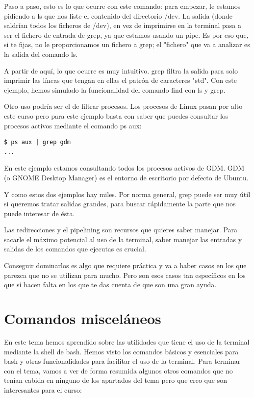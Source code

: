 Paso a paso, esto es lo que ocurre con este comando: para empezar, le estamos pidiendo a ls que nos liste el contenido del directorio /dev. La salida (donde saldrían todos los ficheros de /dev), en vez de imprimirse en la terminal pasa a ser el fichero de entrada de grep, ya que estamos usando un pipe. Es por eso que, si te fijas, no le proporcionamos un fichero a grep; el "fichero" que va a analizar es la salida del comando ls.

A partir de aquí, lo que ocurre es muy intuitivo. grep filtra la salida para solo imprimir las líneas que tengan en ellas el patrón de caracteres "std". Con este ejemplo, hemos simulado la funcionalidad del comando find con ls y grep.

Otro uso podría ser el de filtrar procesos. Los procesos de Linux pasan por alto este curso pero para este ejemplo basta con saber que puedes consultar los procesos activos mediante el comando ps aux:

\begin{tcolorbox-code}
\begin{lstlisting}
$ ps aux | grep gdm
...
\end{lstlisting}
\end{tcolorbox-code}

En este ejemplo estamos consultando todos los procesos activos de GDM. GDM (o GNOME Desktop Manager) es el entorno de escritorio por defecto de Ubuntu.

Y como estos dos ejemplos hay miles. Por norma general, grep puede ser muy útil si queremos tratar salidas grandes, para buscar rápidamente la parte que nos puede interesar de ésta.

Las redirecciones y el pipelining son recursos que quieres saber manejar. Para sacarle el máximo potencial al uso de la terminal, saber manejar las entradas y salidas de los comandos que ejecutas es crucial.

Conseguir dominarlos es algo que requiere práctica y va a haber casos en los que parezca que no se utilizan para mucho. Pero son esos casos tan específicos en los que sí hacen falta en los que te das cuenta de que son una gran ayuda.

\section{Comandos misceláneos}
En este tema hemos aprendido sobre las utilidades que tiene el uso de la terminal mediante la shell de bash. Hemos visto los comandos básicos y esenciales para bash y otras funcionalidades para facilitar el uso de la terminal. Para terminar con el tema, vamos a ver de forma resumida algunos otros comandos que no tenían cabida en ninguno de los apartados del tema pero que creo que son interesantes para el curso:


